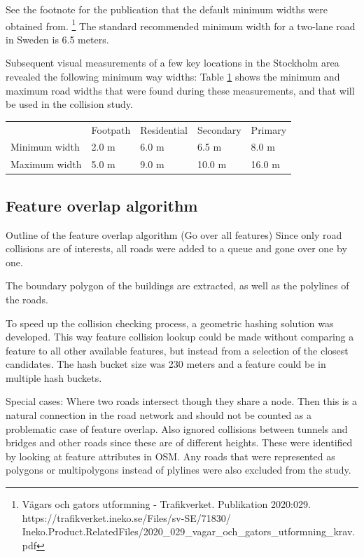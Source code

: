 \documentclass{kththesis}
\begin{document}
See the footnote for the publication that the default minimum widths were obtained from. \footnote{Vägars och gators utformning - Trafikverket. Publikation 2020:029. https://trafikverket.ineko.se/Files/sv-SE/71830/\\Ineko.Product.RelatedFiles/2020\_029\_vagar\_och\_gators\_utformning\_krav.pdf}
The standard recommended minimum width for a two-lane road in Sweden is 6.5 meters.

Subsequent visual measurements of a few key locations in the Stockholm area revealed the following minimum way widths:
Table \ref{table:road-widths} shows the minimum and maximum road widths that were found during these measurements, and that will be used in the collision study.

\begin{table}[H]
    \begin{tabular}{lllll}
                      & Footpath & Residential & Secondary & Primary \\
        Minimum width & 2.0 m    & 6.0 m       & 6.5 m     & 8.0 m   \\
        Maximum width & 5.0 m    & 9.0 m       & 10.0 m    & 16.0 m
    \end{tabular}
    \label{table:road-widths}
\end{table}

\subsection{Feature overlap algorithm}

Outline of the feature overlap algorithm (Go over all features)
Since only road collisions are of interests, all roads were added to a queue and gone over one by one.

The boundary polygon of the buildings are extracted, as well as the polylines of the roads.

To speed up the collision checking process, a geometric hashing solution was developed.
This way feature collision lookup could be made without comparing a feature to all other available features, but instead from a selection of the closest candidates.
The hash bucket size was 230 meters and a feature could be in multiple hash buckets.

Special cases: Where two roads intersect though they share a node.
Then this is a natural connection in the road network and should not be counted as a problematic case of feature overlap.
Also ignored collisions between tunnels and bridges and other roads since these are of different heights.
These were identified by looking at feature attributes in OSM.
Any roads that were represented as polygons or multipolygons instead of plylines were also excluded from the study.
\end{document}
